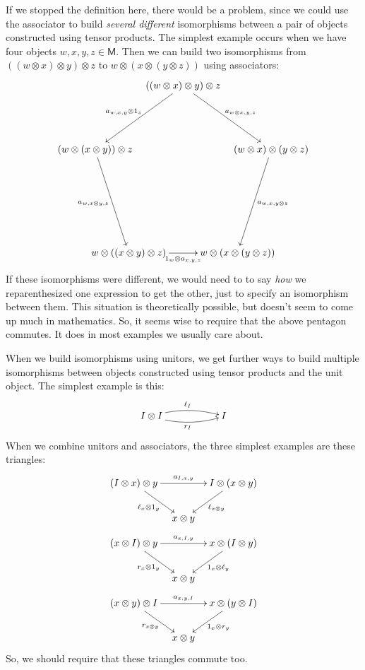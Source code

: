 \documentclass[reqno,12pt]{amsart}
\newcommand{\M}{{\mathsf{M}}}   %
\theoremstyle{definition}
\newcommand{\be}{\begin{equation}}
\newcommand{\ee}{\end{equation}}
\begin{document}
If we stopped the definition here, there would be a problem, since we could
use the associator to build \emph{several different} isomorphisms
between a pair of objects constructed using tensor products.  The simplest
example occurs when we have four objects $w,x,y,z \in \M$.  Then we can
build two isomorphisms from $((w \otimes x) \otimes y) \otimes z$ to $w \otimes (x \otimes (y \otimes z))$ using associators:
\be
\xy 0;/r.3pc/:
    (-24.73,8.03)*+{ (w \otimes (x \otimes y)) \otimes z}="l";
    (0,26)*+{ ((w \otimes x) \otimes y) \otimes z}="t";
    (24.73,8.03)*+{ (w \otimes x) \otimes (y \otimes z)}="r";
    (15.28,-21.03)*+{ w \otimes (x \otimes (y \otimes z))}="br";
    (-15.28,-21.03)*+{ w \otimes ((x \otimes y) \otimes z)}="bl";
     {\ar_{a_{w, x, y} \otimes 1_z} "t";"l"};
     {\ar_{a_{w, x \otimes y, z}} "l";"bl"};
     {\ar_{1_w \otimes a_{x,y,z}} "bl";"br"};
     {\ar^{a_{w, x, y \otimes z}} "r";"br"};
     {\ar^{a_{w \otimes x, y, z}} "t";"r"};
\endxy
\label{pentagon}
\ee
If these isomorphisms were different, we would need to to say \emph{how} we reparenthesized one expression to get the other, just to specify an isomorphism between them.  This situation is theoretically possible, but doesn't seem to come up much in mathematics.   So, it seems wise to require that the above pentagon commutes.  It does in most examples we usually care about.

When we build isomorphisms using unitors, we get further
ways to build multiple isomorphisms between objects constructed using tensor products and the unit object.  The simplest example is this:
\be 
\xymatrix{
I \otimes I   \ar@/^/[rr]^{\ell_I}  \ar@/_/[rr]_{r_I} && I
}  
\label{bigon}
\ee
When we combine unitors and associators, the three simplest examples are these triangles:
\be
\xy 0;/r.3pc/:
(-14,10)*+{(I \otimes x) \otimes y}="l";
(14,10)*+{ I \otimes (x \otimes y)}="r";
(0,0)*+{x \otimes y }="b";
 {\ar^{a_{I,x,y}} "l";"r"};
{\ar_{\ell_x \otimes 1_y} "l";"b"};
{\ar^{\ell_{x \otimes y}} "r";"b"};
\endxy    
\label{triangle1}
\ee
\be
\xy 0;/r.3pc/:
(-14,10)*+{(x \otimes I) \otimes y}="l";
(14,10)*+{x \otimes (I \otimes y)}="r";
(0,0)*+{x \otimes y }="b";
 {\ar^{a_{x,I,y}} "l";"r"};
{\ar_{r_x \otimes 1_y} "l";"b"};
{\ar^{1_x \otimes \ell_y} "r";"b"};
\endxy    
\label{triangle2}
\ee
\be
\xy 0;/r.3pc/:
(-14,10)*+{(x \otimes y) \otimes I}="l";
(14,10)*+{x \otimes (y \otimes I)}="r";
(0,0)*+{x \otimes y }="b";
 {\ar^{a_{x,y,I}} "l";"r"};
{\ar_{r_{x \otimes y}} "l";"b"};
{\ar^{1_x \otimes r_y} "r";"b"};
\endxy    
\label{triangle3}
\ee
So, we should require that these triangles commute too.
\end{document}
